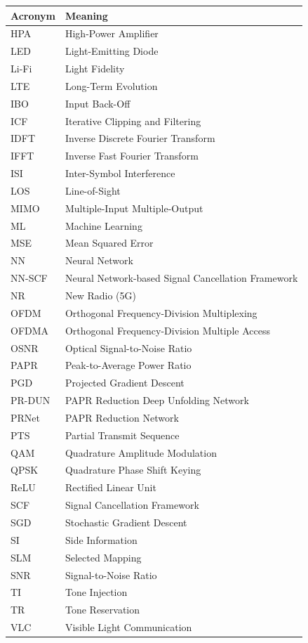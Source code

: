 \begin{center}
\vspace{1cm}
\begin{tabular}{l l}
\toprule
    \textbf{Acronym} & \textbf{Meaning} \\
\midrule
HPA & High-Power Amplifier \\
LED & Light-Emitting Diode \\
Li-Fi & Light Fidelity \\
LTE & Long-Term Evolution \\
IBO & Input Back-Off \\
ICF & Iterative Clipping and Filtering \\
IDFT & Inverse Discrete Fourier Transform \\
IFFT & Inverse Fast Fourier Transform \\
ISI & Inter-Symbol Interference \\
LOS & Line-of-Sight \\
MIMO & Multiple-Input Multiple-Output \\
ML & Machine Learning \\
MSE & Mean Squared Error \\
NN & Neural Network \\
NN-SCF & Neural Network-based Signal Cancellation Framework \\
NR & New Radio (5G) \\
OFDM & Orthogonal Frequency-Division Multiplexing \\
OFDMA & Orthogonal Frequency-Division Multiple Access \\
OSNR & Optical Signal-to-Noise Ratio \\
PAPR & Peak-to-Average Power Ratio \\
PGD & Projected Gradient Descent \\
PR-DUN & PAPR Reduction Deep Unfolding Network \\
PRNet & PAPR Reduction Network \\
PTS & Partial Transmit Sequence \\
QAM & Quadrature Amplitude Modulation \\
QPSK & Quadrature Phase Shift Keying \\
ReLU & Rectified Linear Unit \\
SCF & Signal Cancellation Framework \\
SGD & Stochastic Gradient Descent \\
SI & Side Information \\
SLM & Selected Mapping \\
SNR & Signal-to-Noise Ratio \\
TI & Tone Injection \\
TR & Tone Reservation \\
VLC & Visible Light Communication \\
\bottomrule
\end{tabular}
\end{center}

